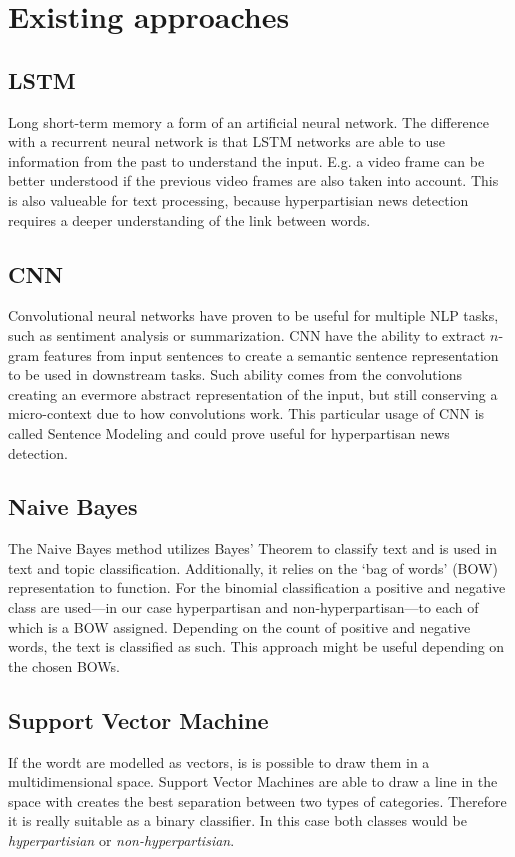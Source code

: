 \section{Existing approaches}



\subsection{LSTM}
Long short-term memory a form of an artificial neural network. The difference with a recurrent neural network is that LSTM networks are able to use information from the past to understand the input. E.g. a video frame can be better understood if the previous video frames are also taken into account. This is also valueable for text processing, because hyperpartisian news detection requires a deeper understanding of the link between words.

\subsection{CNN}
Convolutional  neural networks have proven to be useful for multiple NLP tasks, such as sentiment analysis or summarization.
CNN have the ability to extract $n$-gram features from input sentences to create a semantic sentence representation to be used in downstream tasks.
Such ability comes from the convolutions creating an evermore abstract representation of the input, but still conserving a micro-context due to how convolutions work.
This particular usage of CNN is called Sentence Modeling and could prove useful for hyperpartisan news detection.

\subsection{Naive Bayes}
The Naive Bayes method utilizes Bayes' Theorem to classify text and is used in text and topic classification.
Additionally, it relies on the `bag of words' (BOW) representation to function.
For the binomial classification a positive and negative class are used---in our case hyperpartisan and non-hyperpartisan---to each of which is a BOW assigned.
Depending on the count of positive and negative words, the text is classified as such.
This approach might be useful depending on the chosen BOWs.

\subsection{Support Vector Machine}
If the wordt are modelled as vectors, is is possible to draw them in a multidimensional space. Support Vector Machines are able to draw a line in the space with creates the best separation between two types of categories. Therefore it is really suitable as a binary classifier. In this case both classes would be \textit{hyperpartisian} or \textit{non-hyperpartisian}.

